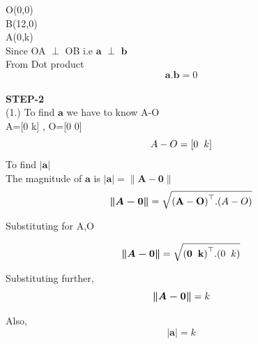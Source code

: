 \documentclass[10pt,a4paper]{report}
\begin{document}
\begin{multicols}{2}
 O(0,0)\vspace{1mm} \\ B(12,0)\vspace{1mm} \\A(0,k)\vspace{1mm} \\
\vspace{3mm} 
Since OA $\perp$ OB  i.e $\boldsymbol{a}$ $\perp$  $\boldsymbol{b}$ \\\vspace{3mm}
From Dot product \\
\begin{equation}
\boldsymbol{a}.\boldsymbol{b} = 0 
\end{equation}\vspace{2mm}\\
\textbf{STEP-2}\vspace{2mm}\\
(1.) To find $\boldsymbol{a}$  we have to know A-O\\\vspace{2mm}
    A=[0 k] , O=[0 0] \\
    \begin{equation}
    A-O = [0 \hspace{2mm} k]
\end{equation}
To find $\boldsymbol{|a|}$ \vspace{2mm}\\
The magnitude of $\boldsymbol{a}$ is $\boldsymbol{|a|} = \boldsymbol{\|A-0\|}$
\vspace{2mm}
\begin{equation}
   \boldsymbol{ \|A-0\|} = \sqrt{ \mathbf{(A-O)}^\top.(A-O)}\vspace{2mm} 
    \end{equation}
    \raggedright Substituting for A,O \\\vspace{2mm}
    
    \begin{equation}
\boldsymbol{\|A-0\|} = \sqrt{ \mathbf{(0 \hspace{2mm} k)}^\top.(0 \hspace{2mm}
k)}\vspace{2mm}
  \end{equation}
\raggedright Substituting further,\\ 
\begin{equation}
 \boldsymbol{\|A-0\|} = k\vspace{2mm}
 \end{equation}
 \raggedright Also,
 \begin{equation}
     \boldsymbol{|a|} = k
 \end{equation}



\end{multicols}
\end{document}
